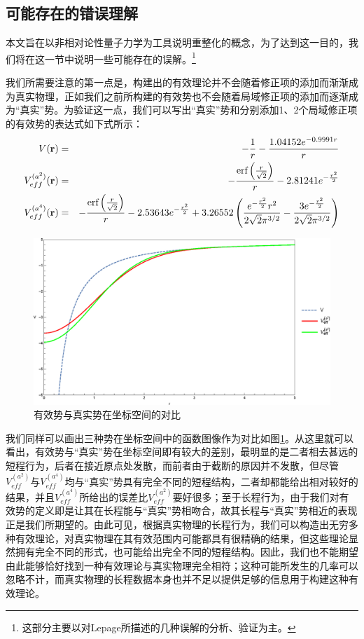 \documentclass[cs4size,titlepage,twoside]{ctexart}
\begin{document}
\subsection{可能存在的错误理解}
本文旨在以非相对论性量子力学为工具说明重整化的概念，为了达到这一目的，我们将在这一节中说明一些可能存在的误解。\footnote{这部分主要以对Lepage所描述的几种误解\cite{Lepage}的分析、验证为主。}

我们所需要注意的第一点是，构建出的有效理论并不会随着修正项的添加而渐渐成为真实物理，正如我们之前所构建的有效势也不会随着局域修正项的添加而逐渐成为“真实”势。为验证这一点，我们可以写出“真实”势和分别添加1、2个局域修正项的有效势的表达式如下式所示：
\begin{eqnarray}\label{realpo}
	V(\vb{r}) &=& -\frac{1}{r}-\frac{1.04152 e^{-0.9991 r}}{r} \\
	\label{effa2} V_{eff}^{(a^2)}(\vb{r}) &=& -\frac{\text{erf}\left(\frac{r}{\sqrt{2}}\right)}{r}-2.81241 e^{-\frac{r^2}{2}} \\
	\label{effa4} V_{eff}^{(a^4)}(\vb{r}) &=& -\frac{\text{erf}\left(\frac{r}{\sqrt{2}}\right)}{r}-2.53643 e^{-\frac{r^2}{2}}+3.26552 \left(\frac{e^{-\frac{r^2}{2}} r^2}{2 \sqrt{2} \pi ^{3/2}}-\frac{3 e^{-\frac{r^2}{2}}}{2 \sqrt{2} \pi ^{3/2}}\right)
\end{eqnarray}
\begin{figure}[!hbp]
	\centering
	\includegraphics[width=6in]{NoFourierTransformation.eps}
	\caption{有效势与真实势在坐标空间的对比}\label{nofourier}
\end{figure}
我们同样可以画出三种势在坐标空间中的函数图像作为对比如图\ref{nofourier}。从这里就可以看出，有效势与“真实”势在坐标空间即有较大的差别，最明显的是二者相去甚远的短程行为，后者在接近原点处发散，而前者由于截断的原因并不发散，但尽管$V_{eff}^{(a^2)}$与$V_{eff}^{(a^4)}$均与“真实”势具有完全不同的短程结构，二者却都能给出相对较好的结果，并且$V_{eff}^{(a^4)}$所给出的误差比$V_{eff}^{(a^2)}$要好很多；至于长程行为，由于我们对有效势的定义即是让其在长程能与“真实”势相吻合，故其长程与“真实”势相近的表现正是我们所期望的。由此可见，根据真实物理的长程行为，我们可以构造出无穷多种有效理论，对真实物理在其有效范围内可能都具有很精确的结果，但这些理论显然拥有完全不同的形式，也可能给出完全不同的短程结构。因此，我们也不能期望由此能够恰好找到一种有效理论与真实物理完全相符；这种可能所发生的几率可以忽略不计，而真实物理的长程数据本身也并不足以提供足够的信息用于构建这种有效理论。
\end{document}

